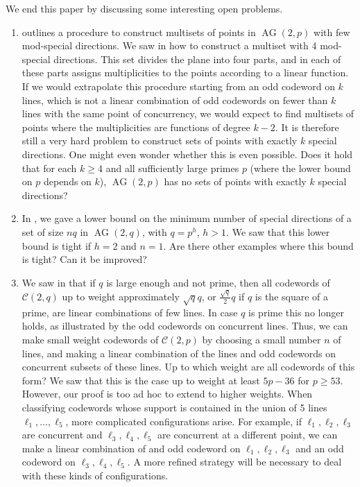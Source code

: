 \documentclass[12pt, a4paper]{article}
\theoremstyle{definition}
\newcommand{\mc}{\mathcal C}
\DeclareMathOperator{\AG}{AG}
\newcommand{\ag}{\AG}
\begin{document}
We end this paper by discussing some interesting open problems.
\begin{enumerate}
 \item {} outlines a procedure to construct multisets of points in $\ag(2,p)$ with few mod-special directions.
 We saw in  how to construct a multiset with 4 mod-special directions.
 This set divides the plane into four parts, and in each of these parts assigns multiplicities to the points according to a linear function.
 If we would extrapolate this procedure starting from an odd codeword on $k$ lines, which is not a linear combination of odd codewords on fewer than $k$ lines with the same point of concurrency, we would expect to find multisets of points where the multiplicities are functions of degree $k-2$.
 It is therefore still a very hard problem to construct sets of points with exactly $k$ special directions.
 One might even wonder whether this is even possible.
 Does it hold that for each $k \geq 4$ and all sufficiently large primes $p$ (where the lower bound on $p$ depends on $k$), $\ag(2,p)$ has no sets of points with exactly $k$ special directions?
 \item In , we gave a lower bound on the minimum number of special directions of a set of size $nq$ in $\ag(2,q)$, with $q = p^h$, $h > 1$.
 We saw that this lower bound is tight if $h = 2$ and $n=1$.
 Are there other examples where this bound is tight?
 Can it be improved?
 \item We saw in  that if $q$ is large enough and not prime, then all codewords of $\mc(2,q)$ up to weight approximately $\sqrt q q$, or $\frac{\sqrt q}2 q$ if $q$ is the square of a prime, are linear combinations of few lines.
 In case $q$ is prime this no longer holds, as illustrated by the odd codewords on concurrent lines.
 Thus, we can make small weight codewords of $\mc(2,p)$ by choosing a small number $n$ of lines, and making a linear combination of the lines and odd codewords on concurrent subsets of these lines.
 Up to which weight are all codewords of this form?
 We saw that this is the case up to weight at least $5p-36$ for $p \geq 53$.
 However, our proof is too ad hoc to extend to higher weights.
 When classifying codewords whose support is contained in the union of 5 lines $\ell_1, \dots, \ell_5$, more complicated configurations arise.
 For example, if $\ell_1, \ell_2, \ell_3$ are concurrent and $\ell_3,\ell_4,\ell_5$ are concurrent at a different point, we can make a linear combination of and odd codeword on $\ell_1,\ell_2,\ell_3$ and an odd codeword on $\ell_3,\ell_4,\ell_5$.
 A more refined strategy will be necessary to deal with these kinds of configurations.
\end{enumerate}
\end{document}
